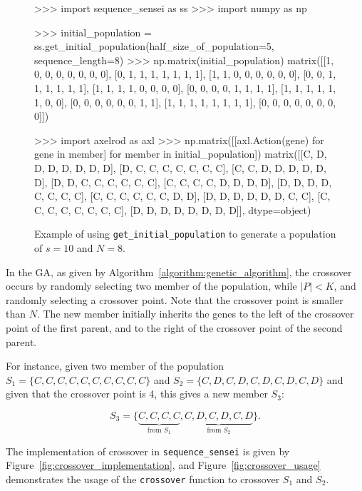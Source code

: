 \begin{figure}[!htbp]
    \begin{usagepy}
>>> import sequence_sensei as ss
>>> import numpy as np

>>> initial_population = ss.get_initial_population(half_size_of_population=5, sequence_length=8)
>>> np.matrix(initial_population)
matrix([[1, 0, 0, 0, 0, 0, 0, 0],
        [0, 1, 1, 1, 1, 1, 1, 1],
        [1, 1, 0, 0, 0, 0, 0, 0],
        [0, 0, 1, 1, 1, 1, 1, 1],
        [1, 1, 1, 1, 0, 0, 0, 0],
        [0, 0, 0, 0, 1, 1, 1, 1],
        [1, 1, 1, 1, 1, 1, 0, 0],
        [0, 0, 0, 0, 0, 0, 1, 1],
        [1, 1, 1, 1, 1, 1, 1, 1],
        [0, 0, 0, 0, 0, 0, 0, 0]])

>>> import axelrod as axl
>>> np.matrix([[axl.Action(gene) for gene in member] for member in initial_population])
matrix([[C, D, D, D, D, D, D, D],
        [D, C, C, C, C, C, C, C],
        [C, C, D, D, D, D, D, D],
        [D, D, C, C, C, C, C, C],
        [C, C, C, C, D, D, D, D],
        [D, D, D, D, C, C, C, C],
        [C, C, C, C, C, C, D, D],
        [D, D, D, D, D, D, C, C],
        [C, C, C, C, C, C, C, C],
        [D, D, D, D, D, D, D, D]], dtype=object)

\end{usagepy}
\caption{Example of using \texttt{get_initial_population} to
generate a population of \(s=10\) and \(N=8\).}\label{fig:get_initial_population_example}
\end{figure}

In the GA, as given by Algorithm~\ref{algorithm:genetic_algorithm}, the
crossover occurs by randomly selecting two member of the population, while \(|P|
< K\), and randomly selecting a crossover point. Note that the crossover
point is smaller than \(N\). The new member initially inherits the
genes to the left of the crossover point of the first parent, and to the right
of the crossover point of the second parent.

For instance, given two member of the population \(S_1 = \{C, C, C, C, C, C, C, C, C, C\}\)
and \(S_2 = \{C, D, C, D, C, D, C, D, C, D\}\) and given that the crossover point is
4, this gives a new member \(S_3\):

\[S_3 = \{\underbrace{C, C, C, C}_{\text{from } S_1}, \underbrace{C, D, C, D, C, D}_{\text{from } S_2}\}.\]

The implementation of crossover in \texttt{sequence_sensei} is given
by Figure~\ref{fig:crossover_implementation}, and Figure~\ref{fig:crossover_usage}
demonstrates the usage of the \texttt{crossover} function to crossover
\(S_1\) and \(S_2\).

